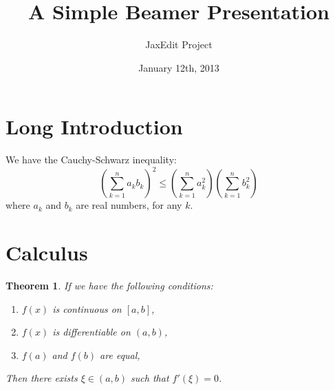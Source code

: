 \documentclass{beamer}
\newtheorem{thm}{Theorem}
\begin{document}
\title{A Simple Beamer Presentation}
\author{JaxEdit Project}
\date{January 12th, 2013}

\begin{frame}
\titlepage
\end{frame}

\tableofcontents

\section[Introduction]{Long Introduction}

\begin{frame}
We have the Cauchy-Schwarz inequality:
  \[ \left( \sum_{k=1}^n a_k b_k \right)^2 \leq \left( \sum_{k=1}^n a_k^2 \right) \left( \sum_{k=1}^n b_k^2 \right) \]
where $a_k$ and $b_k$ are real numbers, for any $k$.
\end{frame}

\section{Calculus}

\begin{frame}
\begin{thm}
If we have the following conditions:
\begin{enumerate}
\item $f(x)$ is continuous on $[a,b]$,
\item $f(x)$ is differentiable on $(a,b)$,
\item $f(a)$ and $f(b)$ are equal,
\end{enumerate}
Then there exists $\xi\in(a,b)$ such that $f'(\xi)=0$.
\end{thm}
\end{frame}
\end{document}
